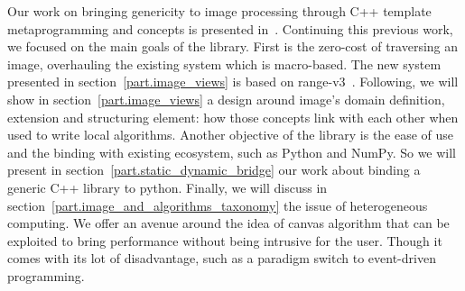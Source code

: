 \vspace{1cm}

Our work on bringing genericity to image processing through C++ template metaprogramming and concepts is presented
in~\citep{roynard.2019.rrpr}. Continuing this previous work, we focused on the main goals of the library. First is the
zero-cost of traversing an image, overhauling the existing system which is macro-based. The new system presented in
section~\ref{part.image_views} is based on
range-v3~\cite{niebler.2014.ranges,niebler.2018.deepranges,niebler.2018.mergingranges}. Following, we will show in
section~\ref{part.image_views} a design around image's domain definition, extension and structuring element: how those
concepts link with each other when used to write local algorithms. Another objective of the library is the ease of use
and the binding with existing ecosystem, such as Python and NumPy. So we will present in
section~\ref{part.static_dynamic_bridge} our work about binding a generic C++ library to python. Finally, we will
discuss in section~\ref{part.image_and_algorithms_taxonomy} the issue of heterogeneous computing. We offer an avenue
around the idea of canvas algorithm that can be exploited to bring performance without being intrusive for the user.
Though it comes with its lot of disadvantage, such as a paradigm switch to event-driven programming.
